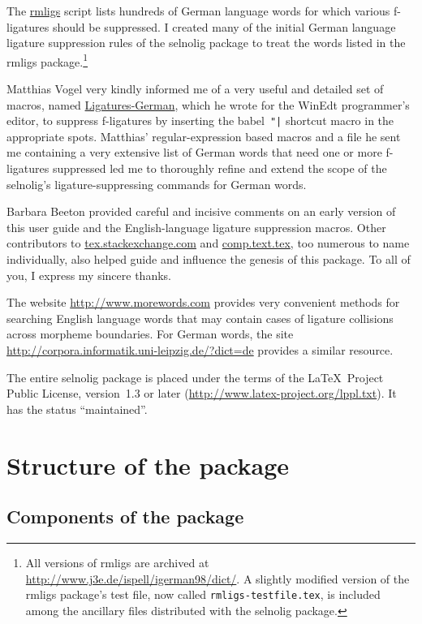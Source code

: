 \documentclass[12pt]{article}
\newcommand{\pkg}[1]{\textsf{#1}}
\newcommand{\opt}[1]{\texttt{#1}}
\begin{document}
The \href{http://www.ctan.org/tex-archive/support/rmligs}{\pkg{rmligs}} script lists hundreds of German language words for which various f\nobreak-liga\-tures should be suppressed. I created many of the initial German language ligature suppression rules of the \pkg{selnolig} package to treat the words listed in the \pkg{rmligs} package.\footnote{All versions of \pkg{rmligs} are archived at \url{http://www.j3e.de/ispell/igerman98/dict/}. A slightly modified version of the \pkg{rmligs} package's test file, now called \opt{rmligs-testfile.tex}, is included among the ancillary files distributed with the \pkg{selnolig} package.} 

Matthias Vogel very kindly informed me of a very useful and detailed set of macros, named \href{http://www.winedt.org/Macros/LaTeX/Ligatures-German.php}{Ligatures-German}, which he wrote for the WinEdt programmer's editor, to suppress f-ligatures by inserting the \pkg{babel}~\Verb+"|+ shortcut macro in the appropriate spots. Matthias' regular-expression based macros and a file he sent me containing a very extensive list of German words that need one or more f-ligatures suppressed led me to thoroughly refine and extend the scope of the \pkg{selnolig}'s ligature-suppressing commands for German words.

Barbara Beeton provided careful and incisive comments on an early version of this user guide and the English-language ligature suppression macros. Other contributors to \url{tex.stackexchange.com} and \url{comp.text.tex}, too numerous to name individually, also helped guide and influence the genesis of this package. To all of you, I express my sincere thanks.

The website \url{http://www.morewords.com} provides very convenient methods for searching English language words that may contain cases of ligature collisions across morpheme boundaries. For German words, the site  \url{http://corpora.informatik.uni-leipzig.de/?dict=de} provides a similar resource. 

The entire \pkg{selnolig} package is placed under the terms of the \LaTeX\ Project Public License, version~1.3 or later (\url{http://www.latex-project.org/lppl.txt}).
It has the status \enquote{maintained}.


\section{Structure of the package}

\subsection{Components of the package}
\end{document}
